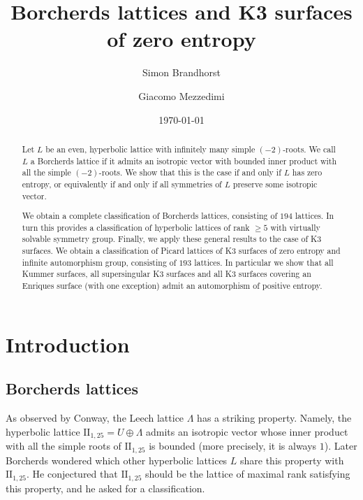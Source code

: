 \documentclass[11pt,letterpaper]{amsart}
\title{Borcherds lattices and K3 surfaces of zero entropy}
\author{Simon Brandhorst}
\author{Giacomo Mezzedimi}
\date{\today}
\newcommand{\vect}[1]{\boldsymbol{#1}}
\DeclareMathOperator{\Aut}{Aut}
\begin{document}
\newcommand{\QQ}{\mathbb{Q}}
\newcommand{\RR}{\mathbb{R}}
\newcommand{\ZZ}{\mathbb{Z}}
\newcommand{\CC}{\mathbb{C}}
\newcommand{\NN}{\mathbb{N}}
\newcommand{\PP}{\mathbb{P}}
\newcommand{\Stabe}{\Aut(\mathcal{D}_L,\vect{e})}
\newcommand{\Stabee}{\Aut(\mathcal{D}_L,\vect{e'})}


\newtheorem{theorem}{Theorem}[section]
\newtheorem{proposition}[theorem]{Proposition}
\newtheorem{lemma}[theorem]{Lemma}
\newtheorem{corollary}[theorem]{Corollary}
\newtheorem{claim}[theorem]{Claim}
\theoremstyle{definition}
\newtheorem*{acknowledgments}{\textbf{Acknowledgments}}
\newtheorem*{conv}{\textbf{Conventions}}
\newtheorem{definition}[theorem]{Definition}
\newtheorem{algorithm}[theorem]{Algorithm}
\theoremstyle{remark}
\newtheorem{remark}[theorem]{Remark}
\newtheorem{question}[theorem]{Question}
\newtheorem{example}[theorem]{Example}


\maketitle

\begin{abstract}
    Let $L$ be an even, hyperbolic lattice with infinitely many simple $(-2)$-roots. We call $L$ a Borcherds lattice if 
    it admits an isotropic vector with bounded inner product with all the simple $(-2)$-roots. 
    We show that this is the case if and only if $L$ has zero entropy, or equivalently if and only if all symmetries of $L$ preserve some isotropic vector. 
    
    We obtain a complete classification of Borcherds lattices, consisting of $194$ lattices. In turn this provides a classification of hyperbolic lattices of rank $\ge 5$ with virtually solvable symmetry group. Finally, we apply these general results to the case of K3 surfaces. We obtain a classification of Picard lattices of K3 surfaces of zero entropy and infinite automorphism group, consisting of $193$ lattices. In particular we show that all Kummer surfaces, all supersingular K3 surfaces and all K3 surfaces covering an Enriques surface (with one exception) admit an automorphism of positive entropy.
\end{abstract}

\section{Introduction}
\subsection{Borcherds lattices}
As observed by Conway, the Leech lattice $\Lambda$ has a striking property. Namely, the hyperbolic lattice $\mathrm{II}_{1,25}=U\oplus \Lambda$ admits an isotropic vector whose inner product with all the simple roots of $\mathrm{II}_{1,25}$ is bounded (more precisely, it is always $1$). Later Borcherds \cite{borcherds.leech} wondered which other hyperbolic lattices $L$ share this property with $\mathrm{II}_{1,25}$. He conjectured that $\mathrm{II}_{1,25}$ should be the lattice of maximal rank satisfying this property, and he asked for a classification.
\end{document}
